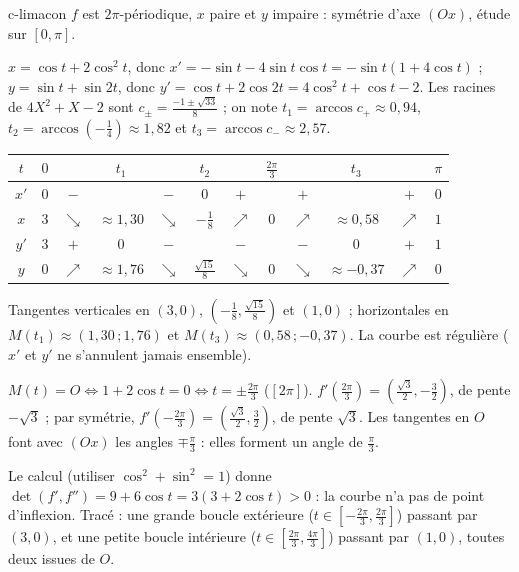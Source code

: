 \begin{corrige}{c-limacon}
 $f$ est $2\pi$-périodique, $x$ paire et $y$ impaire : symétrie d'axe $(Ox)$, étude sur $[0,\pi]$.

 $x=\cos t+2\cos^2t$, donc $x'=-\sin t-4\sin t\cos t=-\sin t(1+4\cos t)$ ; $y=\sin t+\sin2t$, donc $y'=\cos t+2\cos2t=4\cos^2t+\cos t-2$. Les racines de $4X^2+X-2$ sont $c_\pm=\frac{-1\pm\sqrt{33}}8$ ; on note $t_1=\arccos c_+\approx0{,}94$, $t_2=\arccos\left(-\frac14\right)\approx1{,}82$ et $t_3=\arccos c_-\approx2{,}57$.
\begin{center}
\renewcommand{\arraystretch}{1.25}
\begin{tabular}{c|ccccccccccc}
$t$ & $0$ & & $t_1$ & & $t_2$ & & $\frac{2\pi}3$ & & $t_3$ & & $\pi$\\\hline
$x'$ & $0$ & $-$ & & $-$ & $0$ & $+$ & & $+$ & & $+$ & $0$\\
$x$ & $3$ & $\searrow$ & $\approx1{,}30$ & $\searrow$ & $-\frac18$ & $\nearrow$ & $0$ & $\nearrow$ & $\approx0{,}58$ & $\nearrow$ & $1$\\
$y'$ & $3$ & $+$ & $0$ & $-$ & & $-$ & & $-$ & $0$ & $+$ & $1$\\
$y$ & $0$ & $\nearrow$ & $\approx1{,}76$ & $\searrow$ & $\frac{\sqrt{15}}8$ & $\searrow$ & $0$ & $\searrow$ & $\approx-0{,}37$ & $\nearrow$ & $0$
\end{tabular}
\end{center}
Tangentes verticales en $(3,0)$, $\left(-\frac18,\frac{\sqrt{15}}8\right)$ et $(1,0)$ ; horizontales en $M(t_1)\approx(1{,}30\,;1{,}76)$ et $M(t_3)\approx(0{,}58\,;-0{,}37)$. La courbe est régulière ($x'$ et $y'$ ne s'annulent jamais ensemble).

 $M(t)=O\iff1+2\cos t=0\iff t=\pm\frac{2\pi}3$ ($[2\pi]$). $f'\left(\frac{2\pi}3\right)=\left(\frac{\sqrt3}2,-\frac32\right)$, de pente $-\sqrt3$ ; par symétrie, $f'\left(-\frac{2\pi}3\right)=\left(\frac{\sqrt3}2,\frac32\right)$, de pente $\sqrt3$. Les tangentes en $O$ font avec $(Ox)$ les angles $\mp\frac\pi3$ : elles forment un angle de $\frac\pi3$.

 Le calcul (utiliser $\cos^2+\sin^2=1$) donne $\det(f',f'')=9+6\cos t=3(3+2\cos t)>0$ : la courbe n'a pas de point d'inflexion. Tracé : une grande boucle extérieure ($t\in\left[-\frac{2\pi}3,\frac{2\pi}3\right]$) passant par $(3,0)$, et une petite boucle intérieure ($t\in\left[\frac{2\pi}3,\frac{4\pi}3\right]$) passant par $(1,0)$, toutes deux issues de $O$.
\end{corrige}

